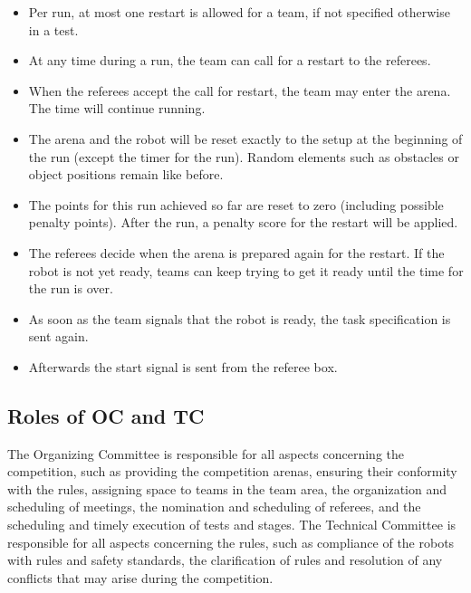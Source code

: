 \begin{itemize}

	\item Per run, at most one restart is allowed for a team, if not specified 			otherwise in a test.
	\item At any time during a run, the team can call for a restart to the 				referees.
	\item When the referees accept the call for restart, the team may enter the 			arena. The time will continue running.
	\item The arena and the robot will be reset exactly to the setup at the 				beginning of the run (except the timer for the run). Random elements such as 			obstacles or object positions remain like before.
	\item The points for this run achieved so far are reset to zero (including 			possible penalty points). After the run, a penalty score for the restart will 	be applied.
	\item The referees decide when the arena is prepared again for the restart. If 	the robot is not yet ready, teams can keep trying to get it ready until the 			time for the run is over.
	\item As soon as the team signals that the robot is ready, the task 					specification is sent again.
	\item Afterwards the start signal is sent from the referee box.
	
\end{itemize}

\subsection{Roles of OC and TC}
The Organizing Committee is responsible for all aspects concerning the competition, such as providing the competition arenas, ensuring their conformity with the rules, assigning space to teams in the team area, the organization and scheduling of meetings, the nomination and scheduling of referees, and the scheduling and timely execution of tests and stages. 
The Technical Committee is responsible for all aspects concerning the rules, such as compliance of the robots with rules and safety standards, the clarification of rules and resolution of any conflicts that may arise during the competition. 

